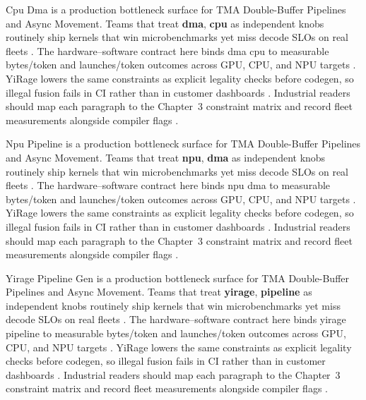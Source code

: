 Cpu Dma is a production bottleneck surface for TMA Double-Buffer Pipelines and Async Movement. Teams that treat \textbf{dma}, \textbf{cpu} as independent knobs routinely ship kernels that win microbenchmarks yet miss decode SLOs on real fleets \citep{semianalysis2024tma,dlbook}. The hardware--software contract here binds dma cpu to measurable bytes/token and launches/token outcomes across GPU, CPU, and NPU targets \citep{amd2024xdna,dao2022flashattention}. YiRage lowers the same constraints as explicit legality checks before codegen, so illegal fusion fails in CI rather than in customer dashboards \citep{amd2024aie,kwon2023vllm}. Industrial readers should map each paragraph to the Chapter~3 constraint matrix and record fleet measurements alongside compiler flags \citep{dlbook,nvidia2024cudagraphs}.

Npu Pipeline is a production bottleneck surface for TMA Double-Buffer Pipelines and Async Movement. Teams that treat \textbf{npu}, \textbf{dma} as independent knobs routinely ship kernels that win microbenchmarks yet miss decode SLOs on real fleets \citep{amd2024xdna,dao2022flashattention}. The hardware--software contract here binds npu dma to measurable bytes/token and launches/token outcomes across GPU, CPU, and NPU targets \citep{amd2024aie,kwon2023vllm}. YiRage lowers the same constraints as explicit legality checks before codegen, so illegal fusion fails in CI rather than in customer dashboards \citep{dlbook,nvidia2024cudagraphs}. Industrial readers should map each paragraph to the Chapter~3 constraint matrix and record fleet measurements alongside compiler flags \citep{dao2022flashattention,liu2024deepseekv3}.

Yirage Pipeline Gen is a production bottleneck surface for TMA Double-Buffer Pipelines and Async Movement. Teams that treat \textbf{yirage}, \textbf{pipeline} as independent knobs routinely ship kernels that win microbenchmarks yet miss decode SLOs on real fleets \citep{amd2024aie,kwon2023vllm}. The hardware--software contract here binds yirage pipeline to measurable bytes/token and launches/token outcomes across GPU, CPU, and NPU targets \citep{dlbook,nvidia2024cudagraphs}. YiRage lowers the same constraints as explicit legality checks before codegen, so illegal fusion fails in CI rather than in customer dashboards \citep{dao2022flashattention,liu2024deepseekv3}. Industrial readers should map each paragraph to the Chapter~3 constraint matrix and record fleet measurements alongside compiler flags \citep{kwon2023vllm,patel2025llminference}.


